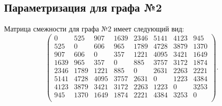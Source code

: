 \begin{table}[H]
\begin{center}
\begin{tabular}{
    |S[table-format=5.2]
    |S[table-format=5.2]
    |S[table-format=5.2]
    |S[table-format=5.2]
    |S[table-format=5.2]
    |S[table-format=5.2]|
    }
    \end{tabular}
  \end{center}
\end{table}

\subsection{Параметризация для графа №2}
Матрица смежности для графа №2 имеет следующий вид:
\begin{equation}
	\begin{pmatrix}
		0 & 525 & 907 & 1639 & 2346 & 5141 & 4123 & 945\\
		525 & 0 & 606 & 965 & 1789 & 4728 & 3879 & 1370\\
		907 & 606 & 0 & 357 & 1221 & 4095 & 3421 & 1649\\
		1639 & 965 & 357 & 0 & 885 & 3757 & 3172 & 1874\\
		2346 & 1789 & 1221 & 885 & 0 & 2631 & 2263 & 2221\\
		5141 & 4728 & 4095 & 3757 & 2631 & 0 & 1223 & 4384\\
		4123 & 3879 & 3421 & 3172 & 2263 & 1223 & 0 & 3253\\
		945 & 1370 & 1649 & 1874 & 2221 & 4384 & 3253 & 0\\
	\end{pmatrix}.
\end{equation}

